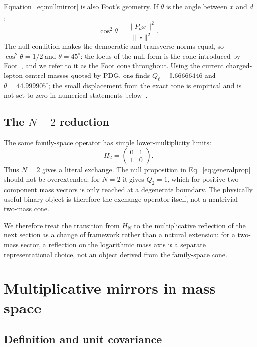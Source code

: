 \documentclass[aps,twocolumn,superscriptaddress,nofootinbib,floatfix]{revtex4-2}
\newcommand{\Pd}{P_d}
\begin{document}
Equation~\eqref{eq:nullmirror} is also Foot's geometry. If $\theta$ is the angle between $x$ and $d$,
\begin{equation}
\cos^2\theta=\frac{\|\Pd x\|^2}{\|x\|^2}.
\end{equation}
The null condition makes the democratic and transverse norms equal, so $\cos^2\theta=1/2$ and $\theta=45^\circ$: the locus of the null form is the cone introduced by Foot~\cite{Foot1994}, and we refer to it as the Foot cone throughout. Using the current charged-lepton central masses quoted by PDG, one finds $Q_\ell=0.66666446$ and $\theta=44.999905^\circ$; the small displacement from the exact cone is empirical and is not set to zero in numerical statements below~\cite{PDG2026}.

\subsection{The $N=2$ reduction}

The same family-space operator has simple lower-multiplicity limits:
\begin{equation}
H_2=\begin{pmatrix}0&1\\1&0\end{pmatrix}.
\label{eq:S21}
\end{equation}
Thus $N=2$ gives a literal exchange. The null proposition in Eq.~\eqref{eq:generalprop} should not be overextended: for $N=2$ it gives $Q_2=1$, which for positive two-component mass vectors is only reached at a degenerate boundary. The physically useful binary object is therefore the exchange operator itself, not a nontrivial two-mass cone.

We therefore treat the transition from $H_N$ to the multiplicative reflection of the next section as a change of framework rather than a natural extension: for a two-mass sector, a reflection on the logarithmic mass axis is a separate representational choice, not an object derived from the family-space cone.

\section{Multiplicative mirrors in mass space}
\label{sec:massmirror}

\subsection{Definition and unit covariance}
\end{document}

